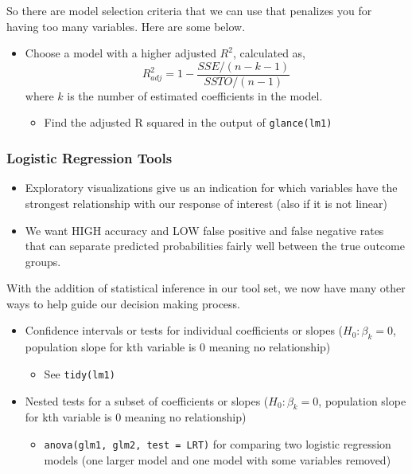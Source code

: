 \documentclass[
]{book}
\providecommand{\tightlist}{%
  \setlength{\itemsep}{0pt}\setlength{\parskip}{0pt}}
\begin{document}
So there are model selection criteria that we can use that penalizes you for having too many variables. Here are some below.

\begin{itemize}
\tightlist
\item
  Choose a model with a higher adjusted \(R^2\), calculated as,
  \[R^2_{adj} = 1 - \frac{SSE/(n-k-1)}{SSTO/(n-1)}\]
  where \(k\) is the number of estimated coefficients in the model.

  \begin{itemize}
  \tightlist
  \item
    Find the adjusted R squared in the output of \texttt{glance(lm1)}
  \end{itemize}
\end{itemize}

\subsubsection{Logistic Regression Tools}\label{logistic-regression-tools}

\begin{itemize}
\tightlist
\item
  Exploratory visualizations give us an indication for which variables have the strongest relationship with our response of interest (also if it is not linear)\\
\item
  We want HIGH accuracy and LOW false positive and false negative rates that can separate predicted probabilities fairly well between the true outcome groups.
\end{itemize}

With the addition of statistical inference in our tool set, we now have many other ways to help guide our decision making process.

\begin{itemize}
\tightlist
\item
  Confidence intervals or tests for individual coefficients or slopes (\(H_0: \beta_k = 0\), population slope for kth variable is 0 meaning no relationship)

  \begin{itemize}
  \tightlist
  \item
    See \texttt{tidy(lm1)}
  \end{itemize}
\item
  Nested tests for a subset of coefficients or slopes (\(H_0: \beta_k = 0\), population slope for kth variable is 0 meaning no relationship)

  \begin{itemize}
  \tightlist
  \item
    \texttt{anova(glm1,\ glm2,\ test\ =\ \textquotesingle{}LRT\textquotesingle{})} for comparing two logistic regression models (one larger model and one model with some variables removed)
  \end{itemize}
\end{itemize}
\end{document}
